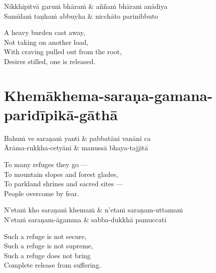 \begin{twochants}
Nikkhipitvā garuṁ bhāraṁ & aññaṁ bhāraṁ anādiya \\
Samūlaṁ taṇhaṁ abbuyha & nicchāto parinibbuto \\
\end{twochants}

\begin{english}
  A heavy burden cast away,\\
  Not taking on another load,\\
  With craving pulled out from the root,\\
  Desires stilled, one is released.
\end{english}


\clearpage

\section{Khemākhema-saraṇa-gamana-paridīpikā-gāthā}



\begin{twochants}
Bahuṁ ve saraṇaṁ yanti & pabbatāni vanāni ca\\
Ārāma-rukkha-cetyāni & manussā bhaya-tajjitā\\
\end{twochants}

\begin{english}
  To many refuges they go ---\\
  To mountain slopes and forest glades,\\
  To parkland shrines and sacred sites ---\\
  People overcome by fear.
\end{english}

\begin{twochants}
N'etaṁ kho saraṇaṁ khemaṁ & n'etaṁ saraṇam-uttamaṁ\\
N'etaṁ saraṇam-āgamma & sabba-dukkhā pamuccati\\
\end{twochants}

\begin{english}
  Such a refuge is not secure,\\
  Such a refuge is not supreme,\\
  Such a refuge does not bring\\
  Complete release from suffering.
\end{english}


